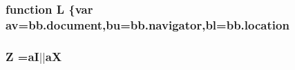 \subsubsection[{L}]{\setlength{\rightskip}{0pt plus 5cm}function L \{var av=bb.\+document,bu=bb.\+navigator,bl=bb.\+location}\label{docs_2_programmer's_manual_2html_2jquery_8js_a38ee4c0b5f4fe2a18d0c783af540d253}
\hypertarget{docs_2_programmer's_manual_2html_2jquery_8js_adc18d83abfd9f87d396e8fd6b6ac0fe1}{}
\subsubsection[{Z}]{\setlength{\rightskip}{0pt plus 5cm}Z =a\+I$\vert$$\vert$a\+X}\label{docs_2_programmer's_manual_2html_2jquery_8js_adc18d83abfd9f87d396e8fd6b6ac0fe1}
